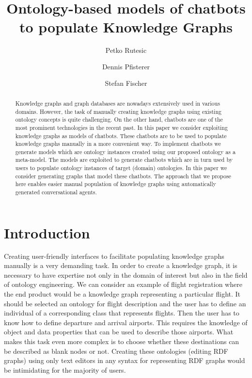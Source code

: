 \documentclass[runningheads]{llncs}
\begin{document}
%
\title{Ontology-based models of chatbots to populate Knowledge Graphs}
%
%
\author{Petko Rutesic \and
Dennis Pfisterer \and
Stefan Fischer}

%
%
%
\maketitle              %
%
\begin{abstract}
Knowledge graphs and graph databases are nowadays extensively used in various domains. However, the task of manually creating knowledge graphs using existing ontology concepts is quite challenging.  On the other hand, chatbots are one of the most prominent technologies in the recent past. In this paper we consider exploiting knowledge graphs as models of chatbots. These chatbots are to be used to populate knowledge graphs manually in a more convenient way. To implement chatbots we generate models which are ontology instances created using our proposed ontology as a meta-model. The models are exploited to generate chatbots which are in turn used by users to populate ontology instances of target (domain) ontologies. In this paper we consider generating graphs that model these chatbots. The approach that we propose here enables easier manual population of knowledge graphs using automatically generated conversational agents.
\end{abstract}
%
%
%
\section{Introduction}

Creating user-friendly interfaces to facilitate populating knowledge graphs manually is a very demanding task. In order to create a knowledge graph, it is necessary to have expertise not only in the domain of interest but also in the field of ontology engineering. We can consider an example of flight registration where the end product would be a knowledge graph representing a particular flight. It should be selected an ontology for flight description and the user has to define an individual of a corresponding class that represents flights. Then the user has to know how to define departure and arrival airports. This requires the knowledge of object and data properties that can be used to describe those airports. What makes this task even more complex is to choose whether these destinations can be described as blank nodes or not. Creating these ontologies (editing RDF graphs) using only text editors in any syntax for representing RDF graphs would be intimidating for the majority of users.
\end{document}
